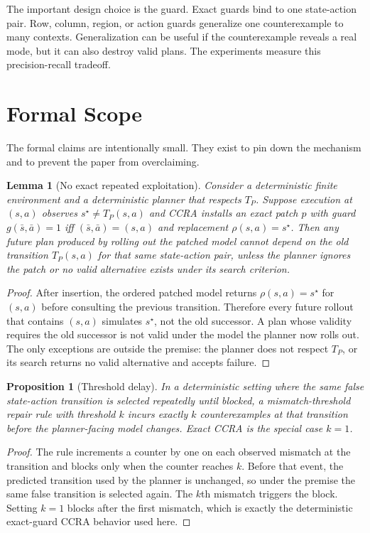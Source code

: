 \documentclass{article}
\newtheorem{lemma}{Lemma}
\newtheorem{proposition}{Proposition}
\begin{document}
The important design choice is the guard. Exact guards bind to one state-action pair. Row, column, region, or action guards generalize one counterexample to many contexts. Generalization can be useful if the counterexample reveals a real mode, but it can also destroy valid plans. The experiments measure this precision-recall tradeoff.

\section{Formal Scope}

The formal claims are intentionally small. They exist to pin down the mechanism and to prevent the paper from overclaiming.

\begin{lemma}[No exact repeated exploitation]
Consider a deterministic finite environment and a deterministic planner that respects $T_P$. Suppose execution at $(s,a)$ observes $s^\star\neq T_P(s,a)$ and CCRA installs an exact patch $p$ with guard $g(\bar{s},\bar{a})=1$ iff $(\bar{s},\bar{a})=(s,a)$ and replacement $\rho(s,a)=s^\star$. Then any future plan produced by rolling out the patched model cannot depend on the old transition $T_P(s,a)$ for that same state-action pair, unless the planner ignores the patch or no valid alternative exists under its search criterion.
\end{lemma}

\begin{proof}
After insertion, the ordered patched model returns $\rho(s,a)=s^\star$ for $(s,a)$ before consulting the previous transition. Therefore every future rollout that contains $(s,a)$ simulates $s^\star$, not the old successor. A plan whose validity requires the old successor is not valid under the model the planner now rolls out. The only exceptions are outside the premise: the planner does not respect $T_P$, or its search returns no valid alternative and accepts failure.
\end{proof}

\begin{proposition}[Threshold delay]
In a deterministic setting where the same false state-action transition is selected repeatedly until blocked, a mismatch-threshold repair rule with threshold $k$ incurs exactly $k$ counterexamples at that transition before the planner-facing model changes. Exact CCRA is the special case $k=1$.
\end{proposition}

\begin{proof}
The rule increments a counter by one on each observed mismatch at the transition and blocks only when the counter reaches $k$. Before that event, the predicted transition used by the planner is unchanged, so under the premise the same false transition is selected again. The $k$th mismatch triggers the block. Setting $k=1$ blocks after the first mismatch, which is exactly the deterministic exact-guard CCRA behavior used here.
\end{proof}
\end{document}
